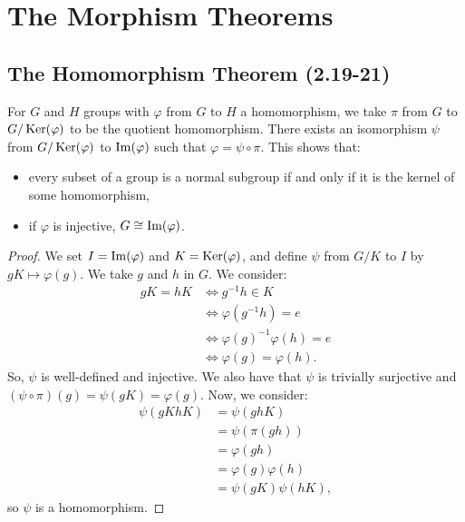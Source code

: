 \section{The Morphism Theorems}

\subsection{The Homomorphism Theorem (2.19-21)}
\label{2.19} \label{2.20} \label{2.21}

For $G$ and $H$ groups with $\varphi$ from $G$ to $H$ a homomorphism, we take 
$\pi$ from $G$ to $G / \operatorname{Ker}(\varphi)$ to be the quotient homomorphism.
There exists an isomorphism $\psi$ from $G / \operatorname{Ker}(\varphi)$ to $\operatorname{Im}(\varphi)$
such that $\varphi = \psi \circ \pi$.
This shows that: \begin{itemize}
    \item every subset of a group is a normal subgroup if and only if
    it is the kernel of some homomorphism,
    \item if $\varphi$ is injective, $G \cong \operatorname{Im}(\varphi)$.
\end{itemize}

\begin{proof}
    We set $I = \operatorname{Im}(\varphi)$ and $K = \operatorname{Ker}(\varphi)$, and define 
    $\psi$ from $G / K$ to $I$ by $gK \mapsto \varphi(g)$. 
    We take $g$ and $h$ in $G$. We consider:
    \begin{align*}
        gK = hK 
        &\Longleftrightarrow g^{-1}h \in K \\
        &\Longleftrightarrow \varphi(g^{-1}h) = e \\
        &\Longleftrightarrow \varphi(g)^{-1}\varphi(h) = e \\
        &\Longleftrightarrow \varphi(g) = \varphi(h).
    \end{align*} So, $\psi$ is well-defined and injective.
    We also have that $\psi$ is trivially surjective and
    $(\psi \circ \pi)(g) = \psi(gK) = \varphi(g)$.
    Now, we consider: \begin{align*}
        \psi(gKhK)
        &= \psi(ghK) \\
        &= \psi(\pi(gh)) \\
        &= \varphi(gh) \\
        &= \varphi(g)\varphi(h) \\
        &= \psi(gK)\psi(hK),
    \end{align*} so $\psi$ is a homomorphism.
\end{proof}

